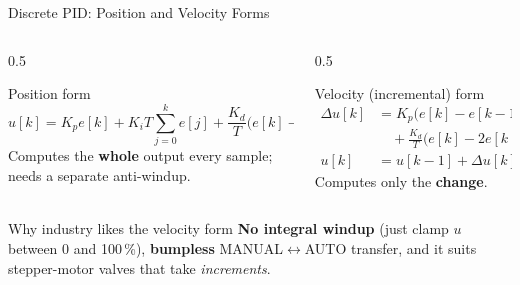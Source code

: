 \documentclass[aspectratio=169]{beamer}
\begin{document}
	\begin{frame}{Discrete PID: Position and Velocity Forms}
		\begin{columns}[T]
			\begin{column}{0.5\textwidth}
				\begin{block}{Position form}
					\small
					\[
					u[k] = K_p e[k] + K_i T\sum_{j=0}^{k} e[j] + \frac{K_d}{T}\big(e[k]-e[k-1]\big)
					\]
					Computes the \textbf{whole} output every sample; needs a separate anti-windup.
				\end{block}
			\end{column}
			\begin{column}{0.5\textwidth}
				\begin{block}{Velocity (incremental) form}
					\small
					\[
					\begin{aligned}
						\Delta u[k] &= K_p\big(e[k]-e[k-1]\big) + K_i T\,e[k]\\
						&\quad + \frac{K_d}{T}\big(e[k]-2e[k-1]+e[k-2]\big)\\
						u[k] &= u[k-1] + \Delta u[k]
					\end{aligned}
					\]
					Computes only the \textbf{change}.
				\end{block}
			\end{column}
		\end{columns}
		\vspace{0.2cm}
		\begin{block}{Why industry likes the velocity form}
			\small \textbf{No integral windup} (just clamp $u$ between 0 and 100\,\%), \textbf{bumpless} MANUAL$\leftrightarrow$AUTO transfer, and it suits stepper-motor valves that take \emph{increments}.
		\end{block}
	\end{frame}
\end{document}
